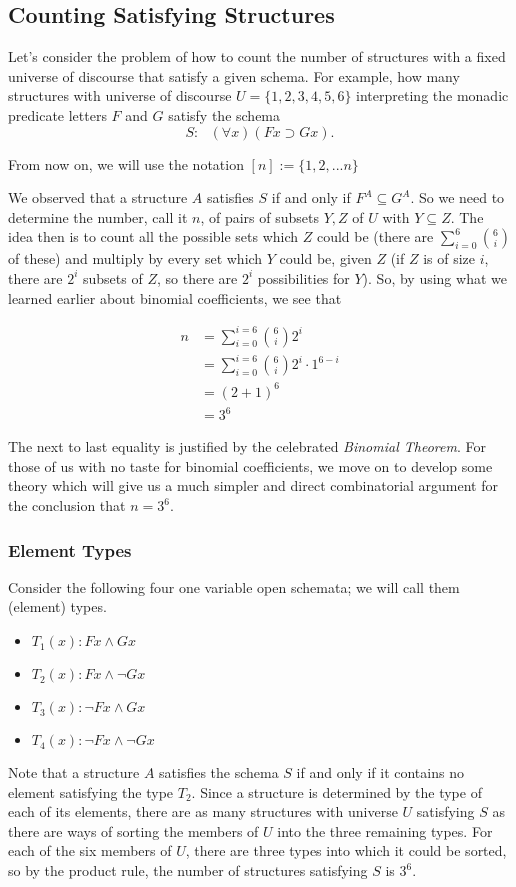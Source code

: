 \subsection{Counting Satisfying Structures}

Let's consider the problem of how to count the number of structures with a fixed universe of discourse that satisfy a given schema. For example, how many structures with universe of discourse $U=\{1,2,3,4,5,6\}$ interpreting the monadic predicate letters $F$ and $G$ satisfy the schema 
\[S:\ \ \ (\forall x)(Fx\supset Gx).\] 

\begin{aside}
    From now on, we will use the notation $[n] := \{1,2,...n\}$
\end{aside}

We observed that a structure $A$ satisfies $S$ if and only if $F^A\subseteq G^A$. So we need to determine the number, call it $n$, of pairs of subsets $Y,Z$ of $U$ with $Y\subseteq Z$. The idea then is to count all the possible sets which $Z$ could be (there are $\sum_{i = 0}^6\binom{6}{i}$ of these) and multiply by every set which $Y$ could be, given $Z$ (if $Z$ is of size $i$, there are $2^i$ subsets of $Z$, so there are $2^i$ possibilities for $Y$). So, by using what we learned earlier about binomial coefficients, we see that 

\begin{align*}
    n& = \sum_{i = 0}^{i = 6}\binom{6}{i}2^i \\
    & = \sum_{i = 0}^{i = 6}\binom{6}{i}2^i\cdot 1^{6-i}\\
    &= (2 + 1)^6 \\
    &= 3^6
\end{align*}

The next to last equality is justified by the celebrated \emph{Binomial Theorem}. For those of us with no taste for binomial coefficients, we move on to develop some theory which will give us a much simpler and direct combinatorial argument for the conclusion that $n= 3^6$.


\subsubsection*{Element Types}

Consider the following four one variable open schemata; we will call them (element) types.
\begin{itemize}
\item $T_1(x): Fx \wedge Gx$
\item $T_2(x): Fx \wedge \neg Gx$
\item $T_3(x): \neg Fx\wedge Gx$
\item $T_4(x): \neg Fx\wedge \neg Gx$
\end{itemize}
Note that a structure $A$ satisfies the schema $S$ if and only if it contains no element satisfying the type $T_2$. Since a structure is determined by the type of each of its elements, there are as many structures with universe $U$ satisfying $S$ as there are ways of sorting the members of $U$ into the three remaining types. For each of the six members of $U$, there are three types into which it could be sorted, so by the product rule, the number of structures satisfying $S$ is $3^6$.


